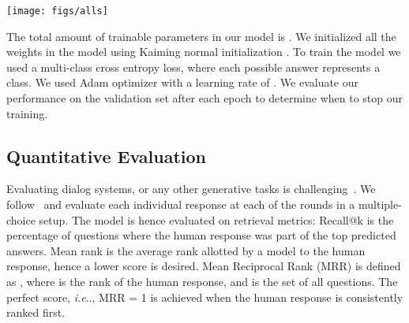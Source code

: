 \documentclass[10pt,twocolumn,letterpaper]{article}
\makeatletter
\def\@onedot{\ifx\@let@token.\else.\null\fi\xspace}
\DeclareRobustCommand\onedot{\futurelet\@let@token\@onedot}
\def\ie{\emph{i.e}\onedot} \def\Ie{\emph{I.e}\onedot}
\makeatother
\begin{document}
\begin{figure*}[t]
\vspace{-0.5cm}
\centering
\texttt{[image: figs/alls]}
\vspace{-0.8cm}
\caption{An illustration of question and image attention over a series of interactions for the same dialog. In addition we provide the ground truth answer, \ie, GT, and our predicted answer, \ie, A.}
	\label{fig:q_i}
	\vspace{-0.5cm}
\end{figure*}


 The total amount of trainable parameters in our model is . We initialized all the weights in the model using Kaiming normal initialization \cite{he2015delving}. To train the model we used a multi-class cross entropy loss, where each possible answer represents a class. We used Adam optimizer with a learning rate of . We evaluate our performance on the validation set after each epoch to determine when to stop our training. 









\subsection{Quantitative Evaluation}
 Evaluating dialog systems, or any other generative tasks  is challenging~\cite{LiuEMNLP2016HowNOT}. We follow~\cite{visdial}  and evaluate each individual response at each of the  rounds in a multiple-choice setup. The model is hence evaluated on retrieval metrics:  Recall@k is the percentage of questions where the human response was part of the top  predicted answers. Mean rank is the average rank allotted by a model to the human response, hence a lower score is desired. Mean Reciprocal Rank (MRR) is defined as , where  is the rank of the human response, and  is the set of all questions. The perfect score, \ie, MRR = 1 is achieved when the  human response is consistently ranked first.
\end{document}
